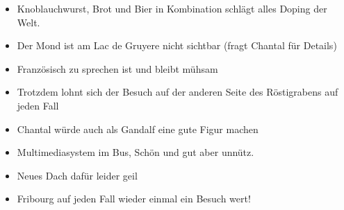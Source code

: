 \begin{itemize}
    \item Knoblauchwurst, Brot und Bier in Kombination schlägt alles Doping der Welt.

    \item Der Mond ist am Lac de Gruyere nicht sichtbar (fragt Chantal für Details)

    \item Französisch zu sprechen ist und bleibt mühsam

    \item Trotzdem lohnt sich der Besuch auf der anderen Seite des Röstigrabens auf jeden Fall

    \item Chantal würde auch als Gandalf eine gute Figur machen

    \item Multimediasystem im Bus,  Schön und gut aber unnütz.

    \item Neues Dach dafür leider geil

    \item Fribourg auf jeden Fall wieder einmal ein Besuch wert!
\end{itemize}

